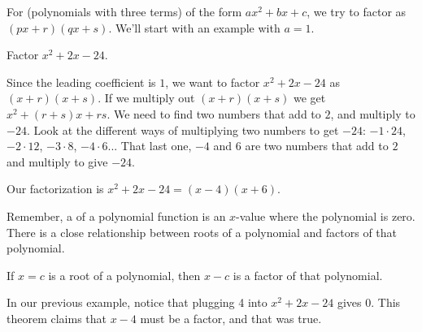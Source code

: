 \documentclass{ximera}
\begin{document}
For  (polynomials with three terms) of the form $ax^2 + bx + c$, we try to factor as $(px+r)(qx+s)$.  We'll start with an example with $a=1$.
\begin{example}
	Factor $x^2+2x-24$.
	\begin{explanation}
		Since the leading coefficient is $1$, we want to factor $x^2+2x-24$ as $(x+r)(x+s)$.  If we multiply out $(x+r)(x+s)$ we get
		$x^2 + (r+s)x + rs$.  We need to find two numbers that add to $2$,
		and multiply to $-24$.  Look at the different ways of multiplying two numbers to get $-24$:  $-1 \cdot 24$, $-2 \cdot 12$, $-3 \cdot 8$, $-4 \cdot 6$...
		That last one, $-4$ and $6$ are two numbers that add to $2$ and multiply to give $-24$.
		
		Our factorization is $x^2+2x-24 = (x-4)(x+6)$.
	\end{explanation}
\end{example}

%		
%		

Remember, a  of a polynomial function is an $x$-value where the polynomial is zero. 
There is a close relationship between roots of a polynomial and factors of that polynomial. 
\begin{theorem}
If $x=c$ is a root of a polynomial, then $x-c$ is a factor of that polynomial.
\end{theorem}
In our previous example, notice that plugging 4 into $x^2+2x-24$ gives 0. This theorem claims that $x-4$ must be a factor, and that was true.
\end{document}
